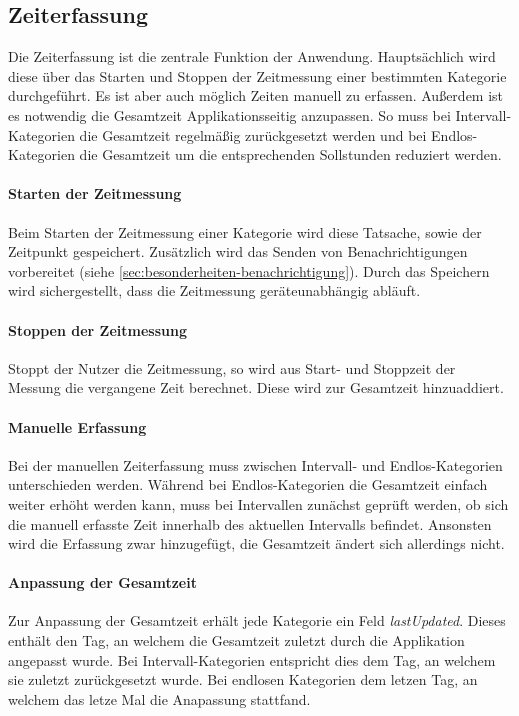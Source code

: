 \subsection{Zeiterfassung}
Die Zeiterfassung ist die zentrale Funktion der Anwendung.
Hauptsächlich wird diese über das Starten und Stoppen der Zeitmessung einer bestimmten Kategorie durchgeführt.
Es ist aber auch möglich Zeiten manuell zu erfassen.
Außerdem ist es notwendig die Gesamtzeit Applikationsseitig anzupassen.
So muss bei Intervall-Kategorien die Gesamtzeit regelmäßig zurückgesetzt werden
und bei Endlos-Kategorien die Gesamtzeit um die entsprechenden Sollstunden reduziert werden.

\paragraph{Starten der Zeitmessung}
Beim Starten der Zeitmessung einer Kategorie wird diese Tatsache,
sowie der Zeitpunkt gespeichert.
Zusätzlich wird das Senden von Benachrichtigungen vorbereitet (siehe \autoref{sec:besonderheiten-benachrichtigung}).
Durch das Speichern wird sichergestellt, dass die Zeitmessung geräteunabhängig abläuft.

\paragraph{Stoppen der Zeitmessung}
Stoppt der Nutzer die Zeitmessung,
so wird aus Start- und Stoppzeit der Messung die vergangene Zeit berechnet.
Diese wird zur Gesamtzeit hinzuaddiert.

\paragraph{Manuelle Erfassung}
Bei der manuellen Zeiterfassung muss zwischen Intervall- und Endlos-Kategorien unterschieden werden.
Während bei Endlos-Kategorien die Gesamtzeit einfach weiter erhöht werden kann,
muss bei Intervallen zunächst geprüft werden,
ob sich die manuell erfasste Zeit innerhalb des aktuellen Intervalls befindet.
Ansonsten wird die Erfassung zwar hinzugefügt,
die Gesamtzeit ändert sich allerdings nicht.

\paragraph{Anpassung der Gesamtzeit}
Zur Anpassung der Gesamtzeit erhält jede Kategorie ein Feld \emph{lastUpdated}.
Dieses enthält den Tag, an welchem die Gesamtzeit zuletzt durch die Applikation angepasst wurde.
Bei Intervall-Kategorien entspricht dies dem Tag, an welchem sie zuletzt zurückgesetzt wurde.
Bei endlosen Kategorien dem letzen Tag, an welchem das letze Mal die Anapassung stattfand.

